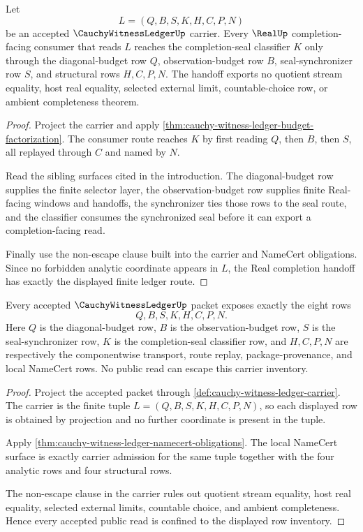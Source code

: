 \begin{theorem}
\label{thm:cauchy-witness-ledger-real-completion-handoff}
Let
$$
L=(Q,B,S,K,H,C,P,N)
$$
be an accepted $\CauchyWitnessLedgerUp$ carrier. Every $\RealUp$ completion-facing consumer that reads $L$ reaches the completion-seal classifier $K$ only through the diagonal-budget row $Q$, observation-budget row $B$, seal-synchronizer row $S$, and structural rows $H,C,P,N$. The handoff exports no quotient stream equality, host real equality, selected external limit, countable-choice row, or ambient completeness theorem.
\end{theorem}
\begin{proof}
Project the carrier and apply \autoref{thm:cauchy-witness-ledger-budget-factorization}. The consumer route reaches $K$ by first reading $Q$, then $B$, then $S$, all replayed through $C$ and named by $N$.

Read the sibling surfaces cited in the introduction. The diagonal-budget row supplies the finite selector layer, the observation-budget row supplies finite Real-facing windows and handoffs, the synchronizer ties those rows to the seal route, and the classifier consumes the synchronized seal before it can export a completion-facing read.

Finally use the non-escape clause built into the carrier and NameCert obligations. Since no forbidden analytic coordinate appears in $L$, the Real completion handoff has exactly the displayed finite ledger route.
\end{proof}

\begin{theorem}
\label{thm:cauchy-witness-ledger-carrier-admission}
Every accepted $\CauchyWitnessLedgerUp$ packet exposes exactly the eight rows
$$
Q,B,S,K,H,C,P,N.
$$
Here $Q$ is the diagonal-budget row, $B$ is the observation-budget row, $S$ is the seal-synchronizer row, $K$ is the completion-seal classifier row, and $H,C,P,N$ are respectively the componentwise transport, route replay, package-provenance, and local NameCert rows. No public read can escape this carrier inventory.
\end{theorem}
\begin{proof}
Project the accepted packet through \autoref{def:cauchy-witness-ledger-carrier}. The carrier is the finite tuple $L=(Q,B,S,K,H,C,P,N)$, so each displayed row is obtained by projection and no further coordinate is present in the tuple.

Apply \autoref{thm:cauchy-witness-ledger-namecert-obligations}. The local NameCert surface is exactly carrier admission for the same tuple together with the four analytic rows and four structural rows.

The non-escape clause in the carrier rules out quotient stream equality, host real equality, selected external limits, countable choice, and ambient completeness. Hence every accepted public read is confined to the displayed row inventory.
\end{proof}

